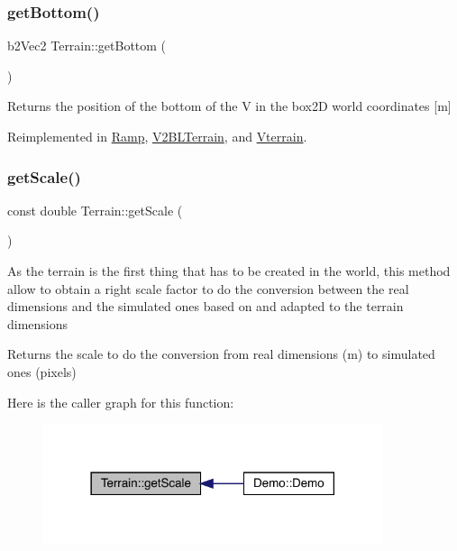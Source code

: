 \subsubsection{\texorpdfstring{get\+Bottom()}{getBottom()}}
{\footnotesize\ttfamily b2\+Vec2 Terrain\+::get\+Bottom (\begin{DoxyParamCaption}{ }\end{DoxyParamCaption})\hspace{0.3cm}{\ttfamily [virtual]}}

\begin{DoxyReturn}{Returns}
the position of the bottom of the V in the box2D world coordinates \mbox{[}m\mbox{]} 
\end{DoxyReturn}


Reimplemented in \mbox{\hyperlink{class_ramp_a6e4926a2d16651162340113155e91e8f}{Ramp}}, \mbox{\hyperlink{class_v2_b_l_terrain_a0534b144e38d8ffea797c3713b3d5380}{V2\+B\+L\+Terrain}}, and \mbox{\hyperlink{class_vterrain_a970e49a3753e1c4bc4424b2602c25f85}{Vterrain}}.

\mbox{\label{class_terrain_af0cff27a194359a13c448c89bd374de3}} 
\subsubsection{\texorpdfstring{get\+Scale()}{getScale()}}
{\footnotesize\ttfamily const double Terrain\+::get\+Scale (\begin{DoxyParamCaption}{ }\end{DoxyParamCaption})}

As the terrain is the first thing that has to be created in the world, this method allow to obtain a right scale factor to do the conversion between the real dimensions and the simulated ones based on and adapted to the terrain dimensions \begin{DoxyReturn}{Returns}
the scale to do the conversion from real dimensions (m) to simulated ones (pixels) 
\end{DoxyReturn}
Here is the caller graph for this function\+:\nopagebreak
\begin{figure}[H]
\begin{center}
\leavevmode
\includegraphics[width=282pt]{class_terrain_af0cff27a194359a13c448c89bd374de3_icgraph}
\end{center}
\end{figure}
\mbox{\label{class_terrain_a8a8629396e5cb03961649acdc23eacf2}} 
